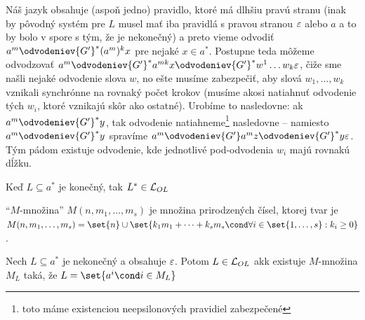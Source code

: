 \begin{dokaz}
\begin{enumerate}
\begin{description}
\begin{description}
              Náš jazyk obsahuje (aspoň jedno) pravidlo, ktoré má
              dlhšiu pravú stranu (inak by pôvodný systém pre $L$
              musel mať iba pravidlá s pravou stranou $\varepsilon$ alebo
              $a$ a to by bolo v spore s tým, že je nekonečný)
              a preto vieme odvodiť
              $a^m \odvodeniev{G'}^{*} (a^m)^{k} x$ pre nejaké
              $x \in a^{*}$. Postupne teda môžeme odvodzovať
              $a^m \odvodeniev{G'}^{*} a^{m k} x
                   \odvodeniev{G'}^{*} w^1 \dots w_k \eps$,
              čiže sme našli nejaké odvodenie slova $w$, no
              ešte musíme zabezpečiť, aby slová $w_1, \dots, w_k$ vznikali
              synchrónne na rovnaký počet krokov
              (musíme akosi natiahnuť odvodenie tých $w_i$,
              ktoré vznikajú skôr ako ostatné).
              Urobíme to nasledovne: ak $a^m \odvodeniev{G'}^{*} y$,
              tak odvodenie natiahneme\footnote{
                  toto máme existenciou neepsilonových pravidiel zabezpečené
              } nasledovne -- namiesto $a^m \odvodeniev{G'}^{*} y$ 
              spravíme
              $a^m \odvodeniev{G'} a^m z \odvodeniev{G'}^{*} y \eps$.
              Tým pádom existuje odvodenie, kde
              jednotlivé pod-odvodenia $w_{i}$ majú rovnakú dĺžku.
          \end{description}
      \end{description}
  \end{enumerate}
\end{dokaz}

\begin{poznamka}
  Keď $L\subseteq a^{*}$ je konečný, tak $L^{*} \in \mathcal{L}_{OL}$
\end{poznamka}

\begin{definicia}
  ``$M$-množina'' $M(n, m_1,\dots,m_s)$ je množina prirodzených čísel,
  ktorej tvar je
  $M(n, m_1, \dots, m_s) = \set{n} \union
    \set{k_1 m_1 + \dots + k_s m_s \cond \forall i \in \set{1,\dots,s}: k_i \geq 0}$.
\end{definicia}

\begin{veta}
  \label{nekon_ol}
  Nech $L\subseteq a^{*}$ je nekonečný a obsahuje $\varepsilon$.
  Potom $L \in \mathcal{L}_{OL}$ akk existuje $M$-množina $M_L$ taká,
  že $L=\set{ a^i \cond i \in M_L}$
\end{veta}

